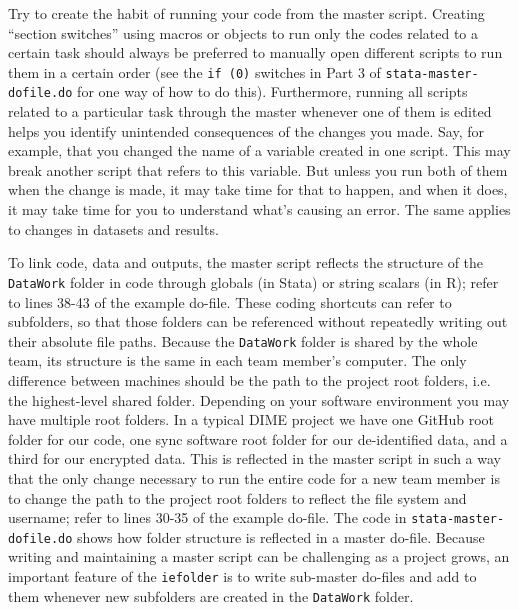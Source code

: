 Try to create the habit of running your code from the master script.
Creating ``section switches'' using macros or objects to run only the codes related to a certain task
should always be preferred to manually open different scripts to run them in a certain order
(see the \texttt{if (0)} switches in Part 3 of \texttt{stata-master-dofile.do} for one way of how to do this).
Furthermore, running all scripts related to a particular task through the master whenever one of them is edited
helps you identify unintended consequences of the changes you made.
Say, for example, that you changed the name of a variable created in one script.
This may break another script that refers to this variable.
But unless you run both of them when the change is made, it may take time for that to happen,
and when it does, it may take time for you to understand what's causing an error.
The same applies to changes in datasets and results.

To link code, data and outputs,
the master script reflects the structure of the \texttt{DataWork} folder in code
through globals (in Stata) or string scalars (in R);
refer to lines 38-43 of the example do-file.
These coding shortcuts can refer to subfolders,
so that those folders can be referenced without repeatedly writing out their absolute file paths.
Because the \texttt{DataWork} folder is shared by the whole team,
its structure is the same in each team member's computer.
The only difference between machines should be
the path to the project root folders, i.e. the highest-level shared folder.
Depending on your software environment you may have multiple root folders.
In a typical DIME project we have one GitHub root folder for our code,
one sync software root folder for our de-identified data,
and a third for our encrypted data.
This is reflected in the master script in such a way that
the only change necessary to run the entire code for a new team member
is to change the path to the project root folders
to reflect the file system and username;
refer to lines 30-35 of the example do-file.
The code in \texttt{stata-master-dofile.do} shows how folder structure is reflected in a master do-file.
Because writing and maintaining a master script can be challenging as a project grows,
an important feature of the \texttt{iefolder} is to write sub-master do-files
and add to them whenever new subfolders are created in the \texttt{DataWork} folder.

